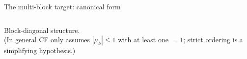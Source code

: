 \documentclass[aspectratio=169,10pt]{beamer}
\begin{document}
\begin{frame}{The multi-block target: canonical form}
\begin{columns}[T]
\begin{center}

            {\scriptsize\textcolor{dimwhite}{Block-diagonal structure.\\
                    (In general CF only assumes $|\mu_k|\le 1$ with at least one $=1$; strict ordering is a simplifying hypothesis.)}}
        \end{center}
    \end{columns}
\end{frame}
\end{document}
